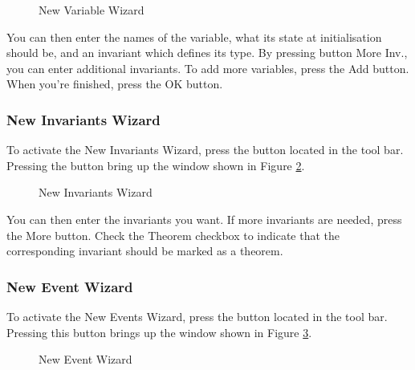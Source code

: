 \begin{figure}[!ht]
\begin{center}
	\caption{New Variable Wizard}
	\label{fig_ref_01_eventb_editor14}
\end{center}
\end{figure}

You can then enter the names of the variable, what its state at initialisation should be, and an invariant which defines its type. By pressing button \textsf{More Inv.}, you can enter additional invariants. To add more variables, press the \textsf{Add} button. When you're finished, press the \textsf{OK} button. 

\subsubsection{New Invariants Wizard}

To activate the \textsf{New Invariants Wizard}, press the  button located in the tool bar. Pressing the button bring up the window shown in Figure \ref{fig_ref_01_eventb_editor15}.

\begin{figure}[!ht]
\begin{center}
	\caption{New Invariants Wizard}
	\label{fig_ref_01_eventb_editor15}
\end{center}
\end{figure}

You can then enter the invariants you want. If more invariants are needed, press the \textsf{More} button. Check the \textsf{Theorem} checkbox to indicate that the corresponding invariant should be marked as a theorem.

\subsubsection{New Event Wizard}

To activate the \textsf{New Events Wizard}, press the  button located in the tool bar. Pressing this button brings up the window shown in Figure \ref{fig_ref_01_eventb_editor16}.

\begin{figure}[ht]
\begin{center}
	\caption{New Event Wizard}
	\label{fig_ref_01_eventb_editor16}
\end{center}
\end{figure}

